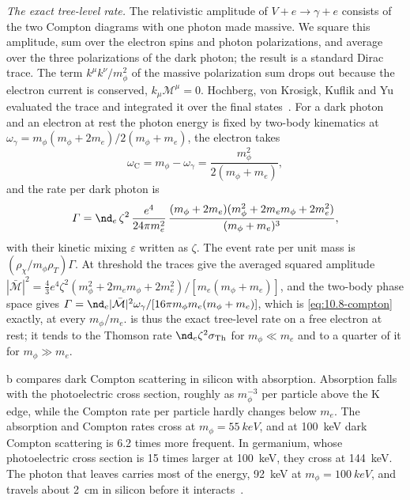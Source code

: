 \emph{The exact tree-level rate.} The relativistic amplitude of $V + e \to \gamma + e$ consists of the two Compton diagrams with one photon made massive. We square this amplitude, sum over the electron spins and photon polarizations, and average over the three polarizations of the dark photon; the result is a standard Dirac trace. The term $k^\mu k^\nu/m_\phi^2$ of the massive polarization sum drops out because the electron current is conserved, $k_\mu\mathcal{M}^\mu = 0$. Hochberg, von Krosigk, Kuflik and Yu evaluated the trace and integrated it over the final states~\cite[Eqs.~(7)--(12)]{hochberg2022impact}. For a dark photon and an electron at rest the photon energy is fixed by two-body kinematics at $\omega_\gamma = m_\phi(m_\phi + 2m_e)/2(m_\phi + m_e)$, the electron takes
\begin{equation*}
  \omega_{\mathrm{C}} = m_\phi - \omega_\gamma = \frac{m_\phi^2}{2(m_\phi + m_e)} ,
\end{equation*}
and the rate per dark photon is~\cite[Eq.~(2)]{hochberg2022impact}
\begin{equation}
  \varGamma = \nd_e\,\zeta^2\,\frac{e^4}{24\pi m_e^2}\,\frac{(m_\phi + 2m_e)(m_\phi^2 + 2m_em_\phi + 2m_e^2)}{(m_\phi + m_e)^3} ,
  \label{eq:10.8-compton}
\end{equation}
with their kinetic mixing $\varepsilon$ written as $\zeta$. The event rate per unit mass is $(\rho_\chi/m_\phi\rho_T)\varGamma$. At threshold the traces give the averaged squared amplitude $|\bar{\mathcal{M}}|^2 = \frac43e^4\zeta^2(m_\phi^2 + 2m_em_\phi + 2m_e^2)/[m_e(m_\phi + m_e)]$, and the two-body phase space gives $\varGamma = \nd_e|\bar{\mathcal{M}}|^2\omega_\gamma/[16\pi m_\phi m_e(m_\phi + m_e)]$, which is \cref{eq:10.8-compton} exactly, at every $m_\phi/m_e$.  is thus the exact tree-level rate on a free electron at rest; it tends to the Thomson rate $\nd_e\zeta^2\sigma_{\mathrm{Th}}$ for $m_\phi \ll m_e$ and to a quarter of it for $m_\phi \gg m_e$.

b compares dark Compton scattering in silicon with absorption. Absorption falls with the photoelectric cross section, roughly as $m_\phi^{-3}$ per particle above the K edge, while the Compton rate per particle hardly changes below $m_e$. The absorption and Compton rates cross at $m_\phi = \SI{55}{keV}$, and at \SI{100}{keV} dark Compton scattering is 6.2 times more frequent. In germanium, whose photoelectric cross section is 15 times larger at \SI{100}{keV}, they cross at \SI{144}{keV}. The photon that leaves carries most of the energy, \SI{92}{keV} at $m_\phi = \SI{100}{keV}$, and travels about \SI{2}{cm} in silicon before it interacts~\cite{berger2010xcom}.

